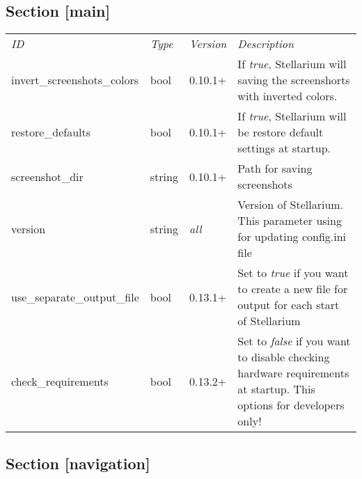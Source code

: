 \subsection{Section {[}main{]}}\label{section-main}

\begin{longtable}[c]{@{}llll@{}}
\toprule
\emph{ID} & \emph{Type} & \emph{Version} &
\emph{Description}\tabularnewline
invert\_screenshots\_colors & bool & 0.10.1+ & If \emph{true},
Stellarium will saving the screenshorts with inverted
colors.\tabularnewline
restore\_defaults & bool & 0.10.1+ & If \emph{true}, Stellarium will be
restore default settings at startup.\tabularnewline
screenshot\_dir & string & 0.10.1+ & Path for saving
screenshots\tabularnewline
version & string & \emph{all} & Version of Stellarium. This parameter
using for updating config.ini file\tabularnewline
use\_separate\_output\_file & bool & 0.13.1+ & Set to \emph{true} if you
want to create a new file for output for each start of
Stellarium\tabularnewline
check\_requirements & bool & 0.13.2+ & Set to \emph{false} if you want
to disable checking hardware requirements at startup. This options for
developers only!\tabularnewline
\bottomrule
\end{longtable}

\subsection{Section {[}navigation{]}}\label{section-navigation}

